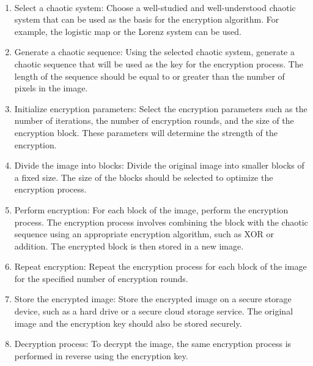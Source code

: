 \documentclass[12pt,a4paper,english]{article}
\begin{document}
\paragraph{}
\begin{enumerate}
    \item Select a chaotic system: Choose a well-studied and well-understood chaotic system that can be used as the basis for the encryption algorithm. For example, the logistic map or the Lorenz system can be used.

    \item Generate a chaotic sequence: Using the selected chaotic system, generate a chaotic sequence that will be used as the key for the encryption process. The length of the sequence should be equal to or greater than the number of pixels in the image.

    \item Initialize encryption parameters: Select the encryption parameters such as the number of iterations, the number of encryption rounds, and the size of the encryption block. These parameters will determine the strength of the encryption.

    \item Divide the image into blocks: Divide the original image into smaller blocks of a fixed size. The size of the blocks should be selected to optimize the encryption process.

    \item Perform encryption: For each block of the image, perform the encryption process. The encryption process involves combining the block with the chaotic sequence using an appropriate encryption algorithm, such as XOR or addition. The encrypted block is then stored in a new image.

    \item Repeat encryption: Repeat the encryption process for each block of the image for the specified number of encryption rounds.

    \item Store the encrypted image: Store the encrypted image on a secure storage device, such as a hard drive or a secure cloud storage service. The original image and the encryption key should also be stored securely.

    \item Decryption process: To decrypt the image, the same encryption process is performed in reverse using the encryption key.
\end{enumerate}
\newpage
\end{document}
